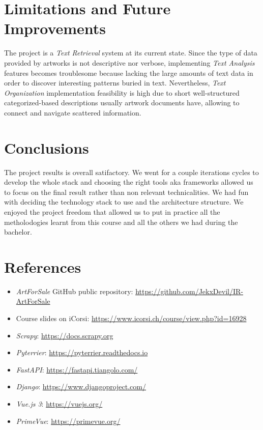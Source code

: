 \documentclass[12pt]{spieman}  %
\begin{document}
\begin{spacing}{1}
    \section{Limitations and Future Improvements}

    The project is a \textit{Text Retrieval} system at its current state.
    Since the type of data provided by artworks is not descriptive nor verbose,
    implementing \textit{Text Analysis} features becomes troublesome because lacking the large amounts of
    text data in order to discover interesting patterns buried in text.
    Nevertheless, \textit{Text Organization} implementation feasibility is high due to
    short well-structured categorized-based descriptions usually artwork documents have,
    allowing to connect and navigate scattered information.

    \section{Conclusions}
    The project results is overall satifactory.
    We went for a couple iterations cycles to develop the whole stack and choosing the right tools aka frameworks
    allowed us to focus on the final result rather than non relevant technicalities.
    We had fun with deciding the technology stack to use and the architecture structure.
    We enjoyed the project freedom that allowed us to put in practice all the metholodogies
    learnt from this course and all the others we had during the bachelor.

    \section{References}\label{sec:references}
    \begin{itemize}
        \item \textit{ArtForSale} GitHub public repository: \url{https://github.com/JekxDevil/IR-ArtForSale}
        \item Course slides on iCorsi: \url{https://www.icorsi.ch/course/view.php?id=16928}
        \item \textit{Scrapy}: \url{https://docs.scrapy.org}
        \item \textit{Pyterrier}: \url{https://pyterrier.readthedocs.io}
        \item \textit{FastAPI}: \url{https://fastapi.tiangolo.com/}
        \item \textit{Django}: \url{https://www.djangoproject.com/}
        \item \textit{Vue.js 3}: \url{https://vuejs.org/}
        \item \textit{PrimeVue}: \url{https://primevue.org/}
    \end{itemize}

\end{spacing}
\end{document}
